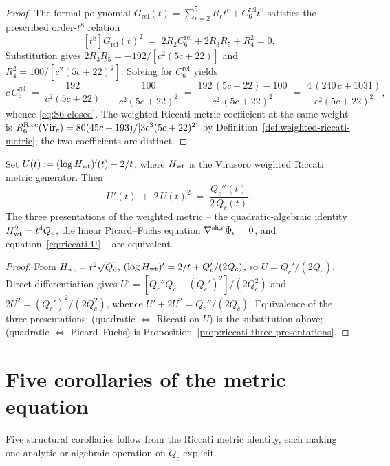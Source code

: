 \begin{proof}
The formal polynomial
$G_{\mathrm{rel}}(t)=\sum_{r=2}^{5}R_rt^r+C_6^{\mathrm{rel}}t^6$
satisfies the prescribed order-$t^{8}$ relation
\[
[t^{8}] G_{\mathrm{rel}}(t)^{2}
\;=\; 2R_2C_6^{\mathrm{rel}}+2R_3R_5+R_4^{2}=0.
\]
Substitution gives
$2R_3R_5=-192/[c^{2}(5c+22)]$ and
$R_4^{2}=100/[c^{2}(5c+22)^{2}]$.  Solving for
$C_6^{\mathrm{rel}}$ yields
\[
c\,C_6^{\mathrm{rel}}
\;=\; \frac{192}{c^{2}(5c+22)}
\;-\; \frac{100}{c^{2}(5c+22)^{2}}
\;=\; \frac{192\,(5c+22) - 100}{c^{2}\,(5c+22)^{2}}
\;=\; \frac{4\,(240\,c + 1031)}{c^{2}(5c+22)^{2}},
\]
whence \eqref{eq:S6-closed}. The weighted Riccati metric coefficient
at the same weight is
$R^{\mathrm{Ricc}}_6(\mathrm{Vir}_c)=80(45c+193)/[3c^3(5c+22)^2]$ by
Definition~\ref{def:weighted-riccati-metric}; the two coefficients
are distinct.
\end{proof}

\begin{theorem}
\label{thm:riccati-U}
\ClaimStatusProvedHere
Set $U(t) := (\log H_{\rm wt})'(t) - 2/t$, where $H_{\rm wt}$ is the
Virasoro weighted Riccati metric generator. Then
\begin{equation}
\label{eq:riccati-U}
U'(t) \;+\; 2\,U(t)^{2} \;=\; \frac{Q_c''(t)}{2\,Q_c(t)}.
\end{equation}
The three presentations of the weighted metric -- the quadratic-algebraic
identity $H_{\rm wt}^{2} = t^{4} Q_c$, the linear Picard--Fuchs equation
$\nabla^{\rm sh, c} \Phi_c = 0$, and
equation~\eqref{eq:riccati-U} -- are equivalent.
\end{theorem}

\begin{proof}
From $H_{\rm wt} = t^{2}\sqrt{Q_c}$,
$(\log H_{\rm wt})' = 2/t + Q_c'/(2 Q_c)$, so
$U = Q_c'/(2 Q_c)$. Direct differentiation gives
$U' = [Q_c'' Q_c - (Q_c')^{2}]/(2 Q_c^{2})$ and
$2 U^{2} = (Q_c')^{2}/(2 Q_c^{2})$, whence $U' + 2 U^{2}
= Q_c''/(2 Q_c)$. Equivalence of the three presentations:
(quadratic $\Leftrightarrow$ Riccati-on-$U$) is the substitution above;
(quadratic $\Leftrightarrow$ Picard--Fuchs) is
Proposition~\ref{prop:riccati-three-presentations}.
\end{proof}

\section{Five corollaries of the metric equation}
\label{sec:five-corollaries}

Five structural corollaries follow from the Riccati metric identity, each
making one analytic or algebraic operation on $Q_c$ explicit.

